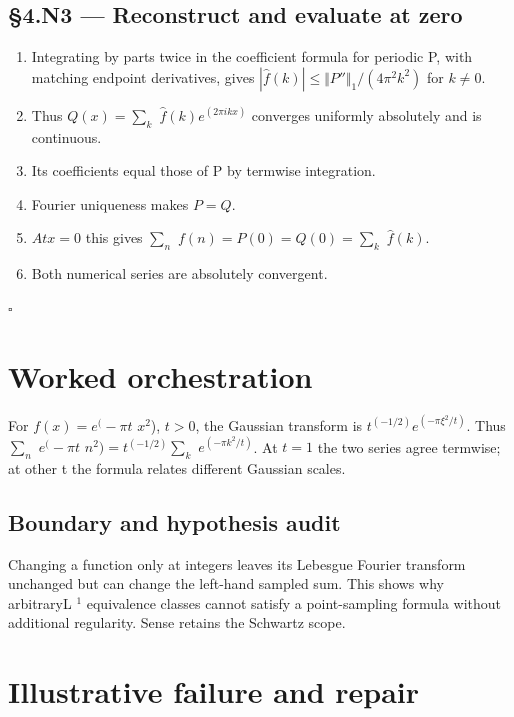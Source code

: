 \documentclass[preprint,12pt,aps,pra,showkeys,amsmath,amssymb,superscriptaddress,floatfix]{revtex4-2}
\theoremstyle{definition}
\theoremstyle{remark}
\begin{document}
\subsection{§4.N3 --- Reconstruct and evaluate at
zero}\label{n3-reconstruct-and-evaluate-at-zero}

\begin{enumerate}
\def\labelenumi{\arabic{enumi}.}
\item
  Integrating by parts twice in the coefficient formula for periodic P,
  with matching endpoint derivatives, gives
  \(|\widehat f(k)|\le \Vert P''\Vert _{1}/(4\pi ^{2}k^{2})\) for
  \(k\ne 0\).
\item
  Thus \(Q(x)=\sum _k\) \(\widehat f(k)e^{(2\pi ikx)}\) converges
  uniformly absolutely and is continuous.
\item
  Its coefficients equal those of P by termwise integration.
\item
  Fourier uniqueness makes \(P=Q\).
\item
  \(Atx=0\) this gives \(\sum _n\) \(f(n)=P(0)=Q(0)=\sum _k\)
  \(\widehat f(k)\).
\item
  Both numerical series are absolutely convergent.
\end{enumerate}

\hfill$\square$

\section{Worked orchestration}

For \(f(x)=e^(-\pi t\) \(x^{2}\)), \(t>0\), the Gaussian transform is
\(t^{(-1/2)}e^{(-\pi \xi ^{2}/t)}\). Thus \(\sum _n\) \(e^(-\pi t\)
\(n^{2})=t^{(-1/2)}\sum _k\) \(e^{(-\pi k^{2}/t)}\). At \(t=1\) the two
series agree termwise; at other t the formula relates different Gaussian
scales.

\subsection{Boundary and hypothesis audit}

Changing a function only at integers leaves its Lebesgue Fourier
transform unchanged but can change the left-hand sampled sum. This shows
why arbitraryL \(^{1}\) equivalence classes cannot satisfy a
point-sampling formula without additional regularity. Sense retains the
Schwartz scope.

\section{Illustrative failure and repair}
\end{document}
